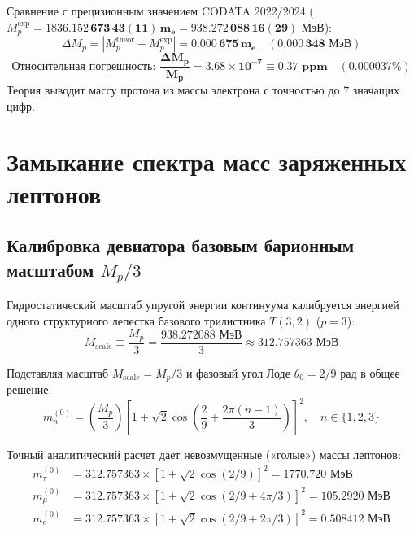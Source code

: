 \documentclass[12pt,a4paper]{article}
\begin{document}
	Сравнение с прецизионным значением CODATA 2022/2024 ($M_p^{\text{exp}} = \mathbf{1836.152\,673\,43(11) \, m_e} = \mathbf{938.272\,088\,16(29) \text{ МэВ}}$):
	\begin{equation}
		\Delta M_p = |M_p^{\text{theor}} - M_p^{\text{exp}}| = \mathbf{0.000\,675 \, m_e} \quad (\mathbf{0.000\,348 \text{ МэВ}})
	\end{equation}
	\begin{equation}
		\text{Относительная погрешность: } \mathbf{\frac{\Delta M_p}{M_p} = 3.68 \times 10^{-7} \equiv 0.37 \text{ ppm}} \quad (\mathbf{0.000037\%})
	\end{equation}
	Теория выводит массу протона из массы электрона с точностью до 7 значащих цифр.
	
	\section{Замыкание спектра масс заряженных лептонов}
	
	\subsection{Калибровка девиатора базовым барионным масштабом $M_p/3$}
	Гидростатический масштаб упругой энергии континуума калибруется энергией одного структурного лепестка базового трилистника $T(3,2)$ ($p=3$):
	\begin{equation}
		M_{\text{scale}} \equiv \frac{M_p}{3} = \frac{938.272088 \text{ МэВ}}{3} \approx \mathbf{312.757363 \text{ МэВ}}
	\end{equation}
	
	Подставляя масштаб $M_{\text{scale}} = M_p/3$ и фазовый угол Лоде $\theta_0 = 2/9$ рад в общее решение:
	\begin{equation}
		m_n^{(0)} = \left( \frac{M_p}{3} \right) \left[ 1 + \sqrt{2} \cos\left( \frac{2}{9} + \frac{2\pi(n-1)}{3} \right) \right]^2, \quad n \in \{1, 2, 3\}
	\end{equation}
	
	Точный аналитический расчет дает невозмущенные («голые») массы лептонов:
	\begin{align}
		m_\tau^{(0)} &= 312.757363 \times \left[ 1 + \sqrt{2} \cos(2/9) \right]^2 = \mathbf{1770.720 \text{ МэВ}} \\
		m_\mu^{(0)}  &= 312.757363 \times \left[ 1 + \sqrt{2} \cos(2/9 + 4\pi/3) \right]^2 = \mathbf{105.2920 \text{ МэВ}} \\
		m_e^{(0)}    &= 312.757363 \times \left[ 1 + \sqrt{2} \cos(2/9 + 2\pi/3) \right]^2 = \mathbf{0.508412 \text{ МэВ}}
	\end{align}
	
\end{document}
